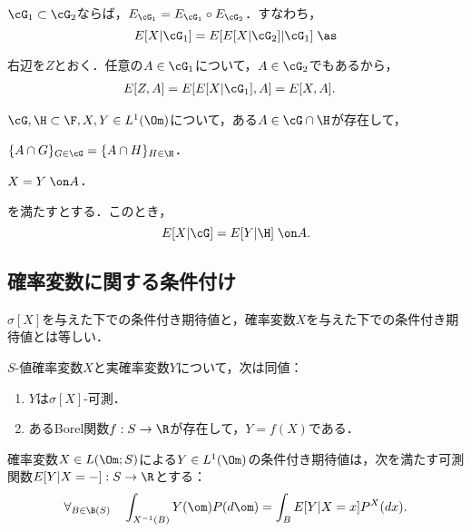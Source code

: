 \documentclass[uplatex,dvipdfmx]{jsreport}
\begin{document}
\begin{proposition}
    $\cG_1\subset\cG_2$ならば，$E_{\cG_1}=E_{\cG_1}\circ E_{\cG_2}$．すなわち，
    \[E[X|\cG_1]=E[E[X|\cG_2]|\cG_1]\;\as\]
\end{proposition}
\begin{Proof}
    右辺を$Z$とおく．任意の$A\in\cG_1$について，$A\in\cG_2$でもあるから，
    \begin{align*}
        E[Z,A]&=E[E[X|\cG_1],A]=E[X,A].
    \end{align*}
\end{Proof}



\begin{proposition}[条件付き期待値の相等]
    $\cG,\H\subset\F,X,Y\in L^1(\Om)$について，ある$A\in\cG\cap\H$が存在して，
    \begin{enumerate}[{[A}1{]}]
        \item $\{A\cap G\}_{G\in\cG}=\{A\cap H\}_{H\in\H}$．
        \item $X=Y\;\on A$．
    \end{enumerate}
    を満たすとする．このとき，
    \[E[X|\cG]=E[Y|\H]\;\on A.\]
\end{proposition}

\subsection{確率変数に関する条件付け}

\begin{tcolorbox}[colframe=ForestGreen, colback=ForestGreen!10!white,breakable,colbacktitle=ForestGreen!40!white,coltitle=black,fonttitle=\bfseries\sffamily,
title=]
$\sigma[X]$を与えた下での条件付き期待値と，確率変数$X$を与えた下での条件付き期待値とは等しい．
\end{tcolorbox}

\begin{lemma}
    $S$-値確率変数$X$と実確率変数$Y$について，次は同値：
    \begin{enumerate}
        \item $Y$は$\sigma[X]$-可測．
        \item あるBorel関数$f:S\to\R$が存在して，$Y=f(X)$である．
    \end{enumerate}
\end{lemma}

\begin{definition}
    確率変数$X\in L(\Om;S)$による$Y\in L^1(\Om)$の条件付き期待値は，次を満たす可測関数$E[Y|X=-]:S\to\R$とする：
    \[\forall_{B\in\B(S)}\quad\int_{X^{-1}(B)}Y(\om)P(d\om)=\int_BE[Y|X=x]P^X(dx).\]
\end{definition}
\end{document}
